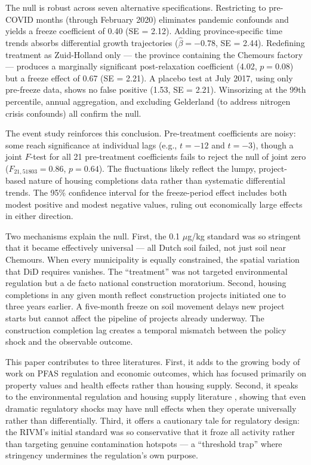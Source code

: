 \documentclass[12pt]{article}
\begin{document}
The null is robust across seven alternative specifications. Restricting to pre-COVID months (through February 2020) eliminates pandemic confounds and yields a freeze coefficient of 0.40 (SE = 2.12). Adding province-specific time trends absorbs differential growth trajectories ($\hat{\beta} = -0.78$, SE = 2.44). Redefining treatment as Zuid-Holland only --- the province containing the Chemours factory --- produces a marginally significant post-relaxation coefficient (4.02, $p = 0.08$) but a freeze effect of 0.67 (SE = 2.21). A placebo test at July 2017, using only pre-freeze data, shows no false positive (1.53, SE = 2.21). Winsorizing at the 99th percentile, annual aggregation, and excluding Gelderland (to address nitrogen crisis confounds) all confirm the null.

The event study reinforces this conclusion. Pre-treatment coefficients are noisy: some reach significance at individual lags (e.g., $t = -12$ and $t = -3$), though a joint $F$-test for all 21 pre-treatment coefficients fails to reject the null of joint zero ($F_{21, 51803} = 0.86$, $p = 0.64$). The fluctuations likely reflect the lumpy, project-based nature of housing completions data rather than systematic differential trends. The 95\% confidence interval for the freeze-period effect includes both modest positive and modest negative values, ruling out economically large effects in either direction.

Two mechanisms explain the null. First, the 0.1 $\mu$g/kg standard was so stringent that it became effectively universal --- all Dutch soil failed, not just soil near Chemours. When every municipality is equally constrained, the spatial variation that DiD requires vanishes. The ``treatment'' was not targeted environmental regulation but a de facto national construction moratorium. Second, housing completions in any given month reflect construction projects initiated one to three years earlier. A five-month freeze on soil movement delays new project starts but cannot affect the pipeline of projects already underway. The construction completion lag creates a temporal mismatch between the policy shock and the observable outcome.

This paper contributes to three literatures. First, it adds to the growing body of work on PFAS regulation and economic outcomes, which has focused primarily on property values \citep{guo2023pfas} and health effects \citep{grandjean2022pfas} rather than housing supply. Second, it speaks to the environmental regulation and housing supply literature \citep{glaeser2009housing, turner2014land}, showing that even dramatic regulatory shocks may have null effects when they operate universally rather than differentially. Third, it offers a cautionary tale for regulatory design: the RIVM's initial standard was so conservative that it froze all activity rather than targeting genuine contamination hotspots --- a ``threshold trap'' where stringency undermines the regulation's own purpose.
\end{document}
